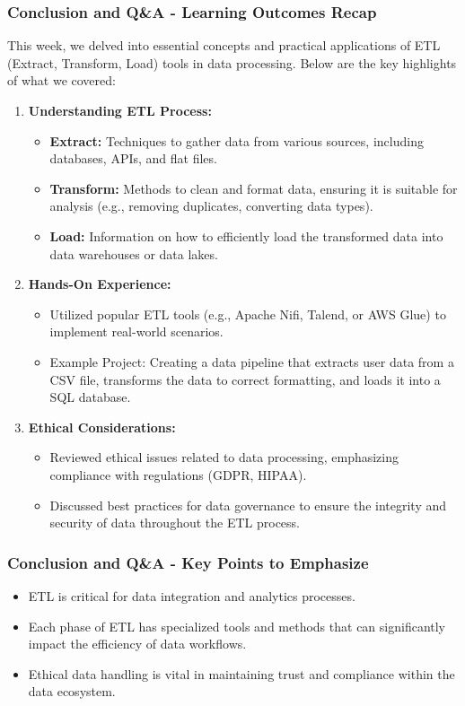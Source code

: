 \documentclass[aspectratio=169]{beamer}
\begin{document}
\begin{frame}[fragile]
  \frametitle{Conclusion and Q\&A - Learning Outcomes Recap}
  
  This week, we delved into essential concepts and practical applications of ETL (Extract, Transform, Load) tools in data processing. Below are the key highlights of what we covered:

  \begin{enumerate}
    \item \textbf{Understanding ETL Process:}
    \begin{itemize}
      \item \textbf{Extract:} Techniques to gather data from various sources, including databases, APIs, and flat files.
      \item \textbf{Transform:} Methods to clean and format data, ensuring it is suitable for analysis (e.g., removing duplicates, converting data types).
      \item \textbf{Load:} Information on how to efficiently load the transformed data into data warehouses or data lakes.
    \end{itemize}
    
    \item \textbf{Hands-On Experience:}
    \begin{itemize}
      \item Utilized popular ETL tools (e.g., Apache Nifi, Talend, or AWS Glue) to implement real-world scenarios.
      \item Example Project: Creating a data pipeline that extracts user data from a CSV file, transforms the data to correct formatting, and loads it into a SQL database.
    \end{itemize}
    
    \item \textbf{Ethical Considerations:}
    \begin{itemize}
      \item Reviewed ethical issues related to data processing, emphasizing compliance with regulations (GDPR, HIPAA).
      \item Discussed best practices for data governance to ensure the integrity and security of data throughout the ETL process.
    \end{itemize}
  \end{enumerate}
\end{frame}

\begin{frame}[fragile]
  \frametitle{Conclusion and Q\&A - Key Points to Emphasize}
  
  \begin{itemize}
    \item ETL is critical for data integration and analytics processes.
    \item Each phase of ETL has specialized tools and methods that can significantly impact the efficiency of data workflows.
    \item Ethical data handling is vital in maintaining trust and compliance within the data ecosystem.
  \end{itemize}
\end{frame}
\end{document}
